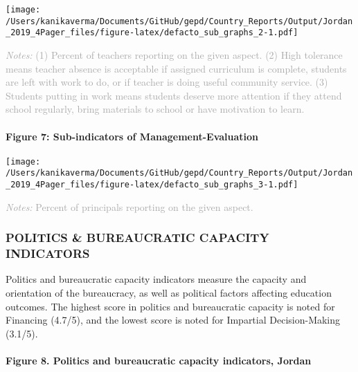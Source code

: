 \documentclass[twocolumn]{article}
\let\oldparagraph\paragraph
\renewcommand{\paragraph}[1]{\oldparagraph{#1}\mbox{}}
\begin{document}
\texttt{[image: /Users/kanikaverma/Documents/GitHub/gepd/Country\_Reports/Output/Jordan\_2019\_4Pager\_files/figure-latex/defacto\_sub\_graphs\_2-1.pdf]}

{\scriptsize
    \textcolor{darkgray}{\textit{Notes:} (1) Percent of teachers reporting on the given aspect. (2) High tolerance means teacher absence is acceptable if assigned curriculum is complete, students are left with work to do, or if teacher is doing useful community service. (3) Students putting in work means students deserve more attention if they attend school regularly, bring materials to school or have motivation to learn.}
  }

\hypertarget{figure-7-sub-indicators-of-management-evaluation}{%
\paragraph{Figure 7: Sub-indicators of
Management-Evaluation}\label{figure-7-sub-indicators-of-management-evaluation}}

\texttt{[image: /Users/kanikaverma/Documents/GitHub/gepd/Country\_Reports/Output/Jordan\_2019\_4Pager\_files/figure-latex/defacto\_sub\_graphs\_3-1.pdf]}

{\scriptsize
    \textcolor{darkgray}{\textit{Notes:} Percent of principals reporting on the given aspect.}
  }

\vfill\null

\hypertarget{politics-bureaucratic-capacity-indicators}{%
\subsubsection{\texorpdfstring{\textbf{POLITICS \& BUREAUCRATIC CAPACITY
INDICATORS}}{POLITICS \& BUREAUCRATIC CAPACITY INDICATORS}}\label{politics-bureaucratic-capacity-indicators}}

Politics and bureaucratic capacity indicators measure the capacity and
orientation of the bureaucracy, as well as political factors affecting
education outcomes. The highest score in politics and bureaucratic
capacity is noted for Financing (4.7/5), and the lowest score is noted
for Impartial Decision-Making (3.1/5).

\hypertarget{figure-8.-politics-and-bureaucratic-capacity-indicators-jordan}{%
\paragraph{Figure 8. Politics and bureaucratic capacity indicators,
Jordan}\label{figure-8.-politics-and-bureaucratic-capacity-indicators-jordan}}
\end{document}
